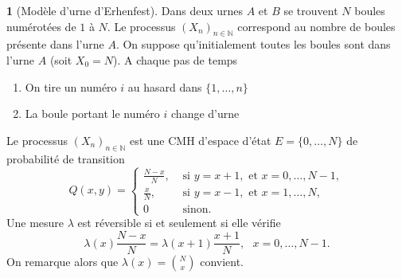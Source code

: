 \documentclass[8pt,notheorems]{beamer}
\def \N{\mathbb N}
\theoremstyle{definition}
\theoremstyle{example}
\newtheorem{example}{\translate{Exemple}}
\theoremstyle{mystyle}
\theoremstyle{plain}
\begin{document}
\begin{frame}
\begin{example}[Modèle d'urne d'Erhenfest]
Dans deux urnes $A$ et $B$ se trouvent $N$ boules numérotées de $1$ à $N$. Le processus $(X_n)_{n\in \N}$ correspond au nombre de boules présente dans l'urne $A$. On suppose qu'initialement toutes les boules sont dans l'urne $A$ (soit $X_0 = N$). A chaque pas de temps
\begin{enumerate}
    \item On tire un numéro $i$ au hasard dans $\{1,\ldots, n\}$
    \item La boule portant le numéro $i$ change d'urne
\end{enumerate}
Le processus $(X_n)_{n\in \N}$ est une CMH d'espace d'état $E = \{0,\ldots, N\}$ de probabilité de transition
$$
Q(x,y) = \begin{cases}
\frac{N-x}{N},&\text{ si }y = x+1,\text{ et }x = 0,\ldots, N-1, \\
\frac{x}{N},&\text{ si }y = x-1,\text{ et }x = 1,\ldots, N,\\
0&\text{ sinon}.
\end{cases}
$$
Une mesure $\lambda$ est réversible si et seulement si elle vérifie
$$
\lambda(x)\frac{N-x}{N} = \lambda(x+1)\frac{x+1}{N},\text{ }x= 0,\ldots, N-1.
$$
On remarque alors que $\lambda(x) = \binom{N}{x}$ convient.
\end{example}
\end{frame}
\end{document}
